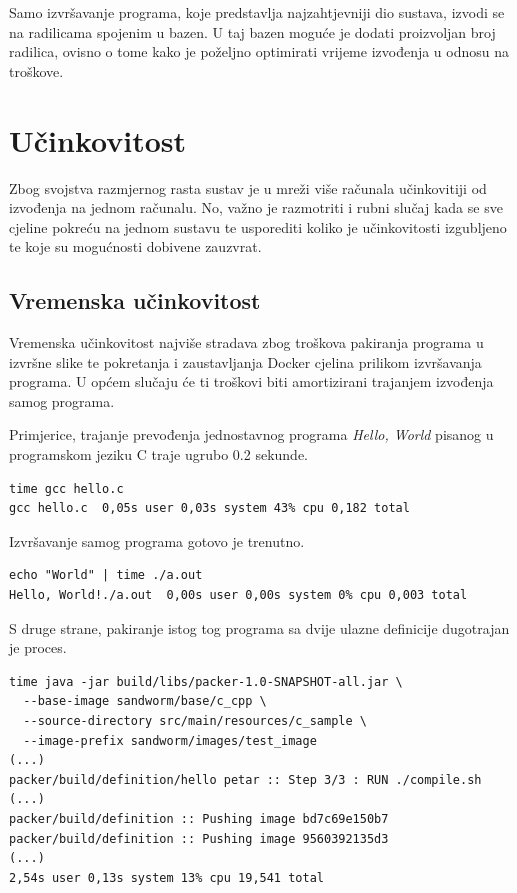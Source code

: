 \documentclass[times, utf8, zavrsni]{fer}
\begin{document}
{{Samo izvršavanje programa, koje predstavlja najzahtjevniji dio sustava, izvodi se na radilicama spojenim u bazen. U taj bazen moguće je dodati proizvoljan broj radilica, ovisno o tome kako je poželjno optimirati vrijeme izvođenja u odnosu na troškove.

\section{Učinkovitost}

Zbog svojstva razmjernog rasta sustav je u mreži više računala učinkovitiji od izvođenja na jednom računalu. No, važno je razmotriti i rubni slučaj kada se sve cjeline pokreću na jednom sustavu te usporediti koliko je učinkovitosti izgubljeno te koje su mogućnosti dobivene zauzvrat.

\subsection{Vremenska učinkovitost}

Vremenska učinkovitost najviše stradava zbog troškova pakiranja programa u izvršne slike te pokretanja i zaustavljanja Docker cjelina prilikom izvršavanja programa. U općem slučaju će ti troškovi biti amortizirani trajanjem izvođenja samog programa.

Primjerice, trajanje prevođenja jednostavnog programa {\textit{Hello, World}} pisanog u programskom jeziku C traje ugrubo 0.2 sekunde.

\begin{lstlisting}
time gcc hello.c 
gcc hello.c  0,05s user 0,03s system 43% cpu 0,182 total
\end{lstlisting}

Izvršavanje samog programa gotovo je trenutno.

\begin{lstlisting}
echo "World" | time ./a.out
Hello, World!./a.out  0,00s user 0,00s system 0% cpu 0,003 total
\end{lstlisting}

S druge strane, pakiranje istog tog programa sa dvije ulazne definicije dugotrajan je proces.

\begin{lstlisting}
time java -jar build/libs/packer-1.0-SNAPSHOT-all.jar \
  --base-image sandworm/base/c_cpp \
  --source-directory src/main/resources/c_sample \
  --image-prefix sandworm/images/test_image
(...)
packer/build/definition/hello petar :: Step 3/3 : RUN ./compile.sh
(...)
packer/build/definition :: Pushing image bd7c69e150b7
packer/build/definition :: Pushing image 9560392135d3
(...)
2,54s user 0,13s system 13% cpu 19,541 total
\end{lstlisting}

}}
\end{document}
